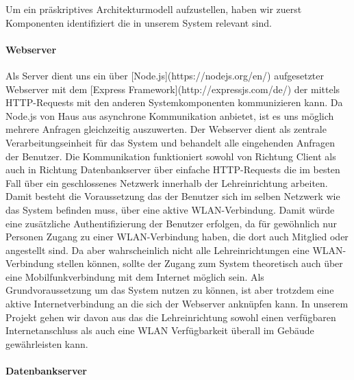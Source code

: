 Um ein präskriptives Architekturmodell aufzustellen, haben wir zuerst
Komponenten identifiziert die in unserem System relevant sind.

\paragraph{Webserver}
\label{sec:Webserver}

Als Server dient uns ein über [Node.js](https://nodejs.org/en/) aufgesetzter
Webserver mit dem [Express Framework](http://expressjs.com/de/) der mittels
HTTP-Requests mit den anderen Systemkomponenten kommunizieren kann.
Da Node.js von Haus aus asynchrone Kommunikation anbietet, ist es uns möglich
mehrere Anfragen gleichzeitig auszuwerten. Der Webserver dient als zentrale
Verarbeitungseinheit für das System und behandelt alle eingehenden Anfragen der
Benutzer. Die Kommunikation funktioniert sowohl von Richtung Client als auch in
Richtung Datenbankserver über einfache HTTP-Requests die im besten Fall über
ein geschlossenes Netzwerk innerhalb der Lehreinrichtung arbeiten. Damit
besteht die Voraussetzung das der Benutzer sich im selben Netzwerk wie das
System befinden muss, \bspw über eine aktive WLAN-Verbindung. Damit würde eine
zusätzliche Authentifizierung der Benutzer erfolgen, da für gewöhnlich nur
Personen Zugang zu einer WLAN-Verbindung haben, die dort auch Mitglied oder
angestellt sind. Da aber wahrscheinlich nicht alle Lehreinrichtungen eine
WLAN-Verbindung stellen können, sollte der Zugang zum System theoretisch auch
über eine Mobilfunkverbindung mit dem Internet möglich sein.
Als Grundvoraussetzung um das System nutzen zu können, ist aber trotzdem eine
aktive Internetverbindung an die sich der Webserver anknüpfen kann. In unserem
Projekt gehen wir davon aus das die Lehreinrichtung sowohl einen verfügbaren
Internetanschluss als auch eine WLAN Verfügbarkeit überall im Gebäude
gewährleisten kann.

\paragraph{Datenbankserver}
\label{sec:Datenbankserver}

